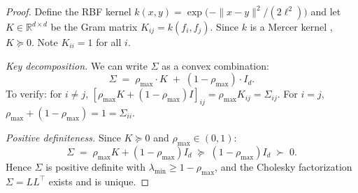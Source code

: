 \documentclass{article}
\theoremstyle{plain}
\theoremstyle{definition}
\theoremstyle{remark}
\newcommand{\R}{\mathbb{R}}
\begin{document}
\begin{proof}
Define the RBF kernel $k(x, y) = \exp\!\bigl(-\|x - y\|^2/(2\ell^2)\bigr)$ and let $K \in \R^{d \times d}$ be the Gram matrix $K_{ij} = k(f_i, f_j)$.
Since $k$ is a Mercer kernel \citep{srinivas2010gpucb}, $K \succeq 0$.
Note $K_{ii} = 1$ for all $i$.

\textit{Key decomposition.}\;
We can write $\Sigma$ as a convex combination:
\[
\Sigma \;=\; \rho_{\max} \cdot K \;+\; (1 - \rho_{\max}) \cdot I_d.
\]
To verify: for $i \neq j$, $[\rho_{\max} K + (1-\rho_{\max})I]_{ij} = \rho_{\max} K_{ij} = \Sigma_{ij}$.
For $i = j$, $\rho_{\max} + (1-\rho_{\max}) = 1 = \Sigma_{ii}$.

\textit{Positive definiteness.}\;
Since $K \succeq 0$ and $\rho_{\max} \in (0,1)$:
\[
\Sigma \;=\; \rho_{\max} K + (1-\rho_{\max}) I_d
      \;\succeq\; (1-\rho_{\max}) I_d
      \;\succ\; 0.
\]
Hence $\Sigma$ is positive definite with $\lambda_{\min} \geq 1 - \rho_{\max}$, and the Cholesky factorization $\Sigma = LL^\top$ exists and is unique.
\end{proof}
\end{document}
